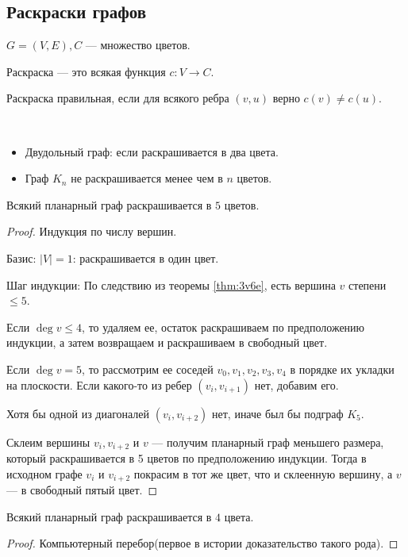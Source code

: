 \subsection{Раскраски графов}

\begin{defn}
    $G = (V, E), C$ --- множество цветов.

    Раскраска --- это всякая функция $c: V \to C$.
\end{defn}

\begin{defn}
    Раскраска правильная, если для всякого ребра $(v, u)$ верно $c(v) \neq c(u)$.
\end{defn}

\begin{examples}~
    \begin{itemize}
        \item Двудольный граф: если раскрашивается в два цвета.
        \item Граф $K_n$ не раскрашивается менее чем в $n$ цветов.
    \end{itemize}
\end{examples}

\begin{theorem}[Хивуд]
    Всякий планарный граф раскрашивается в $5$ цветов.
\end{theorem}

\begin{proof}

    Индукция по числу вершин.

    Базис: $|V| = 1$: раскрашивается в один цвет.

    Шаг индукции: По следствию из теоремы \ref*{thm:3v6e}, есть вершина $v$ степени $\leq 5$.

    Если $\deg{v} \leq 4$, то удаляем ее, остаток раскрашиваем по предположению индукции, а затем возвращаем и раскрашиваем в свободный цвет.

    Если $\deg{v} = 5$, то рассмотрим ее соседей $v_0, v_1, v_2, v_3, v_4$ в порядке их укладки на плоскости. Если какого-то из ребер $(v_i, v_{i+1})$ нет, добавим его.
    
    Хотя бы одной из диагоналей $(v_i, v_{i+2})$ нет, иначе был бы подграф $K_5$.

    Склеим вершины $v_i, v_{i+2}$ и $v$ --- получим планарный граф меньшего размера, который раскрашивается в 5 цветов по предположению индукции. Тогда в исходном графе $v_i$ и $v_{i+2}$ покрасим в тот же цвет, что и склеенную вершину, а $v$ --- в свободный пятый цвет.
\end{proof}

\begin{theorem}
    Всякий планарный граф раскрашивается в $4$ цвета.
\end{theorem}

\begin{proof}
    Компьютерный перебор(первое в истории доказательство такого рода).
\end{proof}